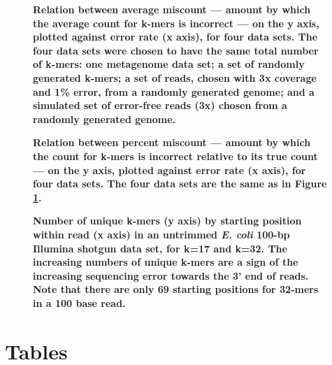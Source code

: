 \documentclass[10pt]{article}
\begin{document}
\begin{figure}[!ht]
\caption{\bf Relation between average miscount --- amount by which
the average count for k-mers is incorrect --- on the y axis, plotted against
error rate (x axis), for four data sets.  The four data
sets were chosen to have the same total number of k-mers: one
metagenome data set; a set of randomly generated k-mers; a set
of reads, chosen with 3x coverage and 1\% error, from a randomly generated
genome; and a simulated set of error-free reads (3x) chosen from a randomly
generated genome.}
\label{fig:average_offset_vs_fpr}
\end{figure}

\begin{figure}[!ht]
\caption{\bf Relation between percent miscount --- amount by which
the count for k-mers is incorrect relative to its true count --- on the y axis, plotted 
against
error rate (x axis), for four data sets.  The four data
sets are the same as in Figure \ref{fig:average_offset_vs_fpr}.}
\label{fig:percent_offset_vs_fpr}
\end{figure}

\begin{figure}[!ht]
\caption{\bf Number of unique k-mers (y axis) by starting position within read (x axis) in 
an untrimmed {\em E. coli} 100-bp Illumina shotgun data set, for k=17 and k=32.  The 
increasing numbers of unique k-mers are a sign of the increasing sequencing error 
towards the 3' end of reads.  Note that there are only 69 starting positions for 32-mers 
in a 100 base read.}
\label{fig:perc_unique_pos}
\end{figure}

\clearpage
\section*{Tables}
\end{document}
